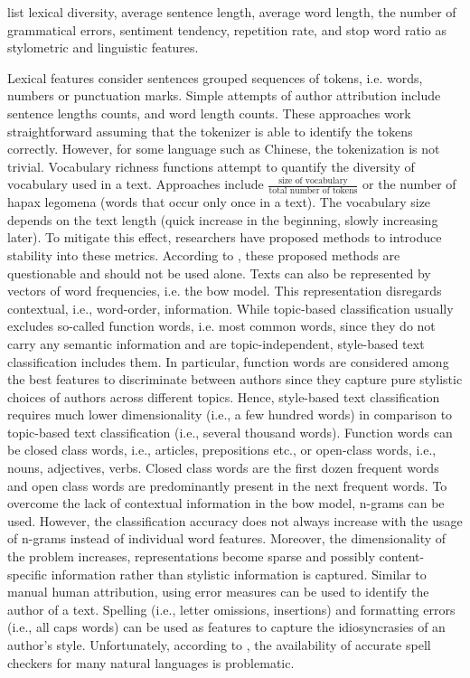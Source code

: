 \citet{bevendorff_overview_2024} list lexical diversity, average sentence length, average word length, 
the number of grammatical errors, sentiment tendency, repetition rate, and stop word ratio as 
stylometric and linguistic features.

Lexical features consider sentences grouped sequences of tokens, i.e. words, numbers or punctuation marks.
Simple attempts of author attribution include sentence lengths counts, and word length counts.
These approaches work straightforward assuming that the tokenizer is able to identify the tokens correctly.
However, for some language such as Chinese, the tokenization is not trivial.
Vocabulary richness functions attempt to quantify the diversity of vocabulary used in a text.
Approaches include $\frac{\text{size of vocabulary}}{\text{total number of tokens}}$ or the 
number of hapax legomena (words that occur only once in a text).
The vocabulary size depends on the text length (quick increase in the beginning, slowly increasing later).
To mitigate this effect, researchers have proposed methods to introduce stability into these metrics. 
According to \citet{stamatatos_survey_2009}, these proposed methods are questionable and should not be used alone.
Texts can also be represented by vectors of word frequencies, i.e. the \ac{bow} model.
This representation disregards contextual, i.e., word-order, information.
While topic-based classification usually excludes so-called function words, 
i.e. most common words, since they do not carry any semantic information and are topic-independent, 
style-based text classification includes them.
In particular, function words are considered among the best features to discriminate between authors 
since they capture pure stylistic choices of authors across different topics.
Hence, style-based text classification requires much lower dimensionality (i.e., a few hundred words) 
in comparison to topic-based text classification (i.e., several thousand words).
Function words can be closed class words, i.e., articles, prepositions etc., 
or open-class words, i.e., nouns, adjectives, verbs.
Closed class words are the first dozen frequent words and 
open class words are predominantly present in the next frequent words.
To overcome the lack of contextual information in the \ac{bow} model, 
n-grams can be used.
However, the classification accuracy does not always increase with the usage of n-grams instead of individual word features.
Moreover, the dimensionality of the problem increases, representations become sparse and possibly content-specific information rather than stylistic information is captured.
Similar to manual human attribution, using error measures can be used to identify the author of a text.
Spelling (i.e., letter omissions, insertions) and formatting errors (i.e., all caps words) can be used as features 
to capture the idiosyncrasies of an author's style.
Unfortunately, according to \cite{stamatatos_survey_2009}, the availability of accurate spell checkers for many natural languages is problematic.


